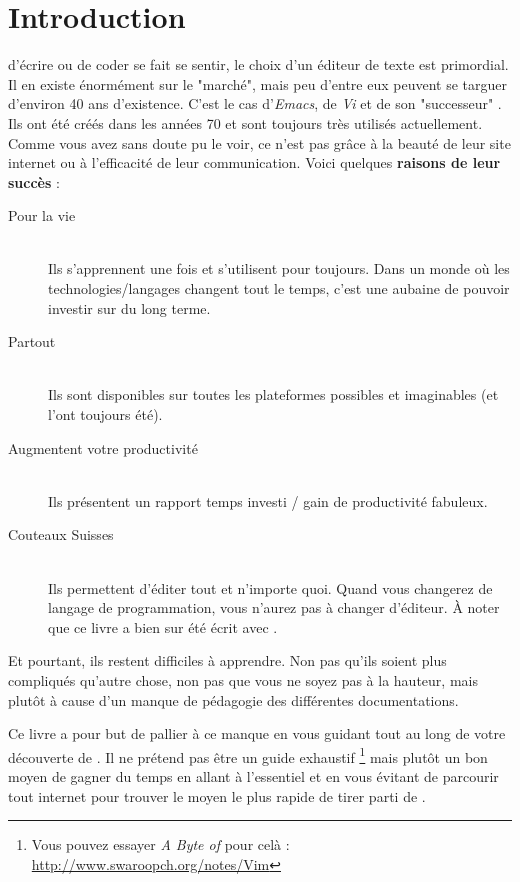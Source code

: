 \chapter*{Introduction}

 d'écrire ou de coder se fait se sentir, le choix d'un éditeur de texte est primordial. Il en existe énormément sur le "marché", mais peu d'entre eux peuvent se targuer d'environ 40 ans d'existence. C'est le cas d'\emph{Emacs}, de \emph{Vi} et de son "successeur" \vim{}. Ils ont été créés dans les années 70 et sont toujours très utilisés actuellement. Comme vous avez sans doute pu le voir, ce n'est pas grâce à la beauté de leur site internet ou à l'efficacité de leur communication. Voici quelques \textbf{raisons de leur succès} :

\begin{description}
    \item[Pour la vie] \hfill \\ Ils s'apprennent une fois et s'utilisent pour toujours. Dans un monde où les technologies/langages changent tout le temps, c'est une aubaine de pouvoir investir sur du long terme.
    \item[Partout] \hfill \\ Ils sont disponibles sur toutes les plateformes possibles et imaginables (et l'ont toujours été).
    \item[Augmentent votre productivité] \hfill \\ Ils présentent un rapport temps investi / gain de productivité fabuleux.
    \item[Couteaux Suisses] \hfill \\ Ils permettent d'éditer tout et n'importe quoi. Quand vous changerez de langage de programmation, vous n'aurez pas à changer d'éditeur. À noter que ce livre a bien sur été écrit avec \vim.
\end{description}

Et pourtant, ils restent difficiles à apprendre. Non pas qu'ils soient plus compliqués qu'autre chose, non pas que vous ne soyez pas à la hauteur, mais plutôt à cause d'un manque de pédagogie des différentes documentations.

Ce livre a pour but de pallier à ce manque en vous guidant tout au long de votre découverte de \vim{}. Il ne prétend pas être un guide exhaustif \footnote{Vous pouvez essayer \emph{A Byte of \vim} pour celà : \url{http://www.swaroopch.org/notes/Vim}} mais plutôt un bon moyen de gagner du temps en allant à l'essentiel et en vous évitant de parcourir tout internet pour trouver le moyen le plus rapide de tirer parti de \vim.

